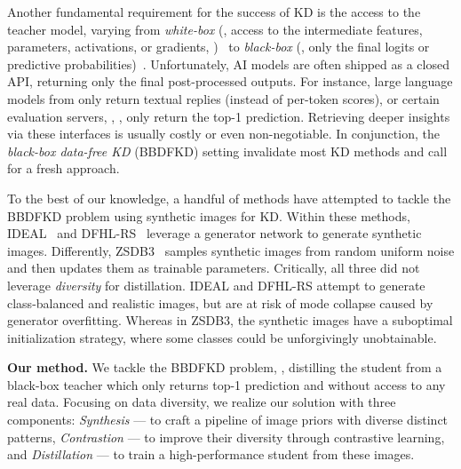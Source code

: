 \begin{foldable} %
    Another fundamental requirement for the success of KD is the access to the teacher model, varying from \textit{white-box} (\ie, access to the intermediate features, parameters, activations, or gradients, \etc)~\cite{romero2015fitnets, yim2017gift, chen2019data} to \textit{black-box} (\ie, only the final logits or predictive probabilities)~\cite{wang2020neural, nguyen2022black, vo2024improving}.
    Unfortunately, AI models are often shipped as a closed API, returning only the final post-processed outputs.
    For instance, large language models from \cite{openai2022, anthropic2024} only return textual replies (instead of per-token scores), or certain evaluation servers, \eg, \cite{russakovsky2015imagenet}, only return the top-1 prediction.
    Retrieving deeper insights via these interfaces is usually costly or even non-negotiable.
    In conjunction, the \textit{black-box data-free KD} (BBDFKD) setting invalidate most KD methods and call for a fresh approach.
\end{foldable}

\begin{foldable} %
    To the best of our knowledge, a handful of methods have attempted to tackle the BBDFKD problem using synthetic images for KD.
    Within these methods, IDEAL~\cite{zhang2022ideal} and DFHL-RS~\cite{yuan2024data} leverage a generator network to generate synthetic images.
    Differently, ZSDB3~\cite{wang2021zero} samples synthetic images from random uniform noise and then updates them as trainable parameters.
    Critically, all three did not leverage \textit{diversity} for distillation.
    IDEAL and DFHL-RS attempt to generate class-balanced and realistic images, but are at risk of mode collapse caused by generator overfitting.
    Whereas in ZSDB3, the synthetic images have a suboptimal initialization strategy, where some classes could be unforgivingly unobtainable.
\end{foldable}

\begin{foldable} %
    \textbf{Our method.} We tackle the BBDFKD problem, \ie, distilling the student from a black-box teacher which only returns top-1 prediction and without access to any real data.
    Focusing on data diversity, we realize our solution with three components: \textit{Synthesis} --- to craft a pipeline of image priors with diverse distinct patterns, \textit{Contrastion} --- to improve their diversity through contrastive learning, and \textit{Distillation} --- to train a high-performance student from these images.
\end{foldable}

